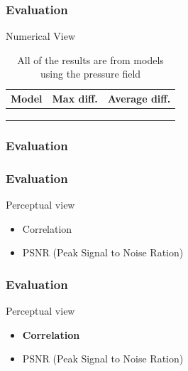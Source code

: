 \documentclass[18pt, xcolor=table]{beamer}
\begin{document}
\begin{frame}[t]
  \frametitle{Evaluation}
  \large{Numerical View}
  \vspace{1.5cm}
  \begin{center}
    \begin{table}
      \begin{tabular}{|c|c|c|}
        \hline
        \rowcolor{blue!50}
        \textbf{Model}                       & \textbf{Max diff.} & \textbf{Average diff.} \\
        \hline
        \color{gray!!140}{Constant}          & \color{gray!!140}{14.56} & \color{gray!!140}{0.60}  \\
        \rowcolor{gray!50}
        \color{red}{Inflow speed}            & \color{red}{32.16} & \color{red}{0.55}  \\
        \color{gray!!140}{Viscosity-density} & \color{gray!!140}{57.00} & \color{gray!!140}{13.85} \\
        \hline
      \end{tabular}
      \caption{All of the results are from models using the pressure field}
    \end{table}
  \end{center}
\end{frame}

\begin{frame}[t]
  \frametitle{Evaluation}
  
\end{frame}

\begin{frame}[t]
  \frametitle{Evaluation}
  \large{Perceptual view}
  \begin{itemize}
  \item Correlation
  \item PSNR (Peak Signal to Noise Ration)
  \end{itemize}
\end{frame}

\begin{frame}[t]
  \frametitle{Evaluation}
  \large{Perceptual view}
  \begin{itemize}
  \item \textbf{Correlation}
  \item PSNR (Peak Signal to Noise Ration)
  \end{itemize}
\end{frame}
\end{document}
